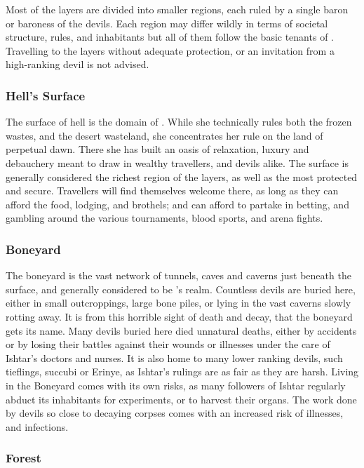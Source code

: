 Most of the layers are divided into smaller regions, each ruled by a single
baron or baroness of the devils. Each region may differ wildly in terms of
societal structure, rules, and inhabitants but all of them follow the basic
tenants of . Travelling to the layers without adequate
protection, or an invitation from a high-ranking devil is not advised.

\subsubsection{Hell's Surface}
\label{sec:Hells Surface}

The surface of hell is the domain of . While she
technically rules both the frozen wastes, and the desert wasteland, she
concentrates her rule on the land of perpetual dawn. There she has built an
oasis of relaxation, luxury and debauchery meant to draw in wealthy
travellers, and devils alike. The surface is generally considered the richest
region of the layers, as well as the most protected and secure. Travellers
will find themselves welcome there, as long as they can afford the food,
lodging, and brothels; and can afford to partake in betting, and gambling
around the various tournaments, blood sports, and arena fights.

\subsubsection{Boneyard}
\label{sec:Boneyard}

The boneyard is the vast network of tunnels, caves and caverns just beneath
the surface, and generally considered to be 's
realm. Countless devils are buried here, either in small outcroppings, large
bone piles, or lying in the vast caverns slowly rotting away. It is from this
horrible sight of death and decay, that the boneyard gets its name. Many
devils buried here died unnatural deaths, either by accidents or by losing
their battles against their wounds or illnesses under the care of Ishtar's
doctors and nurses. It is also home to many lower ranking devils, such
tieflings, succubi or Erinye, as Ishtar's rulings are as fair as they are
harsh. Living in the Boneyard comes with its own risks, as many followers of
Ishtar regularly abduct its inhabitants for experiments, or to harvest their
organs. The work done by devils so close to decaying corpses comes with an
increased risk of illnesses, and infections.

\subsubsection{Forest}
\label{sec:Forest}

